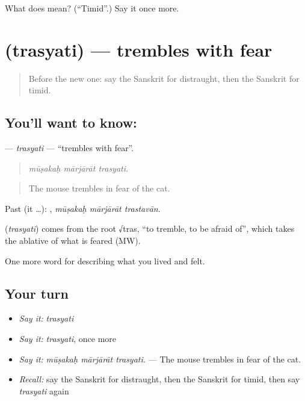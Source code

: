 \begin{tcolorbox}[breakable,colback=teal!4,colframe=teal!35!black,title={Before you move on}]
What does  mean? (\textquotedblleft{}Timid\textquotedblright{}.) Say it once more.
\end{tcolorbox}
\section[\texorpdfstring{\sk{त्रस्यति} (trasyati)}{त्रस्यति (trasyati)}]{ (trasyati) — trembles with fear}

\label{lesson:SA-C463-trasyati}



\begin{quote}
Before the new one: say the Sanskrit for distraught, then the Sanskrit for timid.
\end{quote}

\subsection*{You'll want to know: }
\textbf{} — \emph{trasyati} — \textquotedblleft{}trembles with fear\textquotedblright{}.

\begin{quote}
  
\end{quote}

\begin{quote}
\emph{mūṣakaḥ mārjārāt trasyati.}
\end{quote}

\begin{quote}
The mouse trembles in fear of the cat.
\end{quote}

Past (it …):   , \emph{mūṣakaḥ mārjārāt trastavān}.

\begin{cousinweb}
\textbf{} (\emph{trasyati}) comes from the root √tras, \textquotedblleft{}to tremble, to be afraid of\textquotedblright{}, which takes the ablative of what is feared (MW).
\end{cousinweb}

\begin{grammarlens}[title={What you've built}]
One more word for describing what you lived and felt.
\end{grammarlens}

\subsection*{Your turn}
\begin{itemize}
\raggedright
  \item \emph{Say it:} \emph{trasyati}
  \item \emph{Say it:} \emph{trasyati}, once more
  \item \emph{Say it:} \emph{mūṣakaḥ mārjārāt trasyati.} — The mouse trembles in fear of the cat.
  \item \emph{Recall:} say the Sanskrit for distraught, then the Sanskrit for timid, then say \emph{trasyati} again
\end{itemize}

